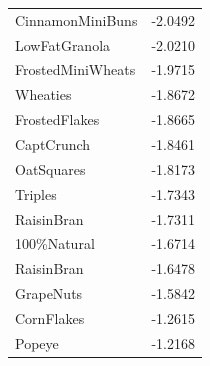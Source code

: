 \begin{table}[!htbp]
\begin{tabular}{lr}
CinnamonMiniBuns & -2.0492 \\
LowFatGranola & -2.0210 \\
FrostedMiniWheats & -1.9715 \\
Wheaties & -1.8672 \\
FrostedFlakes & -1.8665 \\
CaptCrunch & -1.8461 \\
OatSquares & -1.8173 \\
Triples & -1.7343 \\
RaisinBran & -1.7311 \\
100\%Natural & -1.6714 \\
RaisinBran & -1.6478 \\
GrapeNuts & -1.5842 \\
CornFlakes & -1.2615 \\
Popeye & -1.2168 \\
\bottomrule
\end{tabular}

\end{table}
